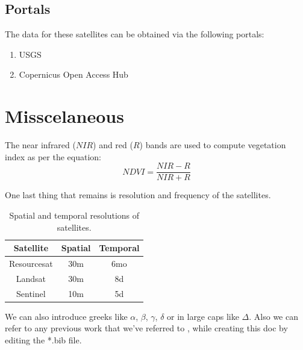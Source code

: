 \documentclass[10pt, twocolumn, a4paper]{article}
\begin{document}
\subsection{Portals}
The data for these satellites can be obtained via the following portals:
\begin{enumerate}
  \item USGS
  \item Copernicus Open Access Hub
\end{enumerate}

\section{Misscelaneous}
The near infrared ($NIR$) and red ($R$) bands are used to compute vegetation index as per the equation:
\begin{equation}
  NDVI = \frac{NIR - R}{NIR + R}
\end{equation}

One last thing that remains is resolution and frequency of the satellites.
\begin{table}[h]
  \centering
  \begin{tabular}{|c|c|c|}
    \hline
    \textbf{Satellite} & \textbf{Spatial} & \textbf{Temporal} \\
    \hline
    Resourcesat & 30m & 6mo \\
    Landsat & 30m & 8d \\
    Sentinel & 10m & 5d \\
    \hline
  \end{tabular}
  \caption{Spatial and temporal resolutions of satellites.}
  \label{tab:resolutions}
\end{table}

We can also introduce greeks like $\alpha$, $\beta$, $\gamma$, $\delta$ or in large caps like $\Delta$. Also we can refer to any previous work that we've referred to \cite{overleaf} \cite{latextut}, while creating this doc by editing the *.bib file.



\end{document}
